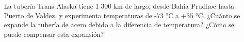 \item La tubería Trans-Alaska tiene 1 300 km de largo, desde Bahía Prudhoe hasta Puerto de Valdez, y experimenta temperaturas de -73 °C a +35 °C. ¿Cuánto se expande la tubería de acero debido a la diferencia de temperatura? ¿Cómo se puede compensar esta expansión?
